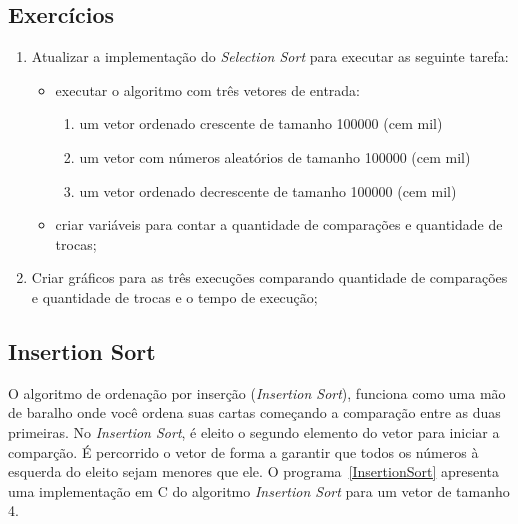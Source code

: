 \documentclass[11pt,fleqn]{book} %
\begin{document}
\subsection*{Exercícios}
\begin{enumerate}
	\item Atualizar a implementação do \textit{Selection Sort} para executar as seguinte tarefa:
	\begin{itemize}
		\item executar o algoritmo com três vetores de entrada:
		\begin{enumerate}
			\item um vetor ordenado crescente de tamanho 100000 (cem mil)
			\item um vetor com números aleatórios de tamanho 100000 (cem mil)
			\item um vetor ordenado decrescente de tamanho 100000 (cem mil)
		\end{enumerate} 
		\item criar variáveis para contar a quantidade de comparações e quantidade de trocas;
	\end{itemize} 
	\item Criar gráficos para as três execuções comparando quantidade de comparações e quantidade de trocas e o tempo de execução;
\end{enumerate} 
\newpage
\subsection*{Insertion Sort}
O algoritmo de ordenação por inserção (\textit{Insertion Sort}), funciona como uma mão de baralho onde você ordena suas cartas começando a comparação entre as duas primeiras.
No \textit{Insertion Sort}, é eleito o segundo elemento do vetor para iniciar a comparção. É percorrido o vetor de forma a garantir que todos os números à esquerda do eleito sejam menores que ele.
O programa~\ref{InsertionSort} apresenta uma implementação em C do algoritmo \textit{Insertion Sort} para um vetor de tamanho 4.
\label{InsertionSort}
\end{document}

